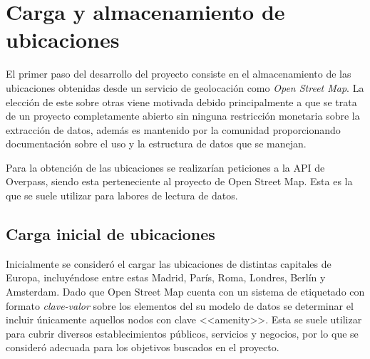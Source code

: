 


\section{Carga y almacenamiento de ubicaciones}

El primer paso del desarrollo del proyecto consiste en el almacenamiento de las ubicaciones obtenidas desde un servicio de geolocación como \textit{Open Street Map}. La elección de este sobre otras viene motivada debido principalmente a que se trata de un proyecto completamente abierto sin ninguna restricción monetaria sobre la extracción de datos, además es mantenido por la comunidad proporcionando documentación sobre el uso y la estructura de datos que se manejan.

Para la obtención de las ubicaciones se realizarían peticiones a la API de Overpass, siendo esta perteneciente al proyecto de Open Street Map. Esta es la que se suele utilizar para labores de lectura de datos.

\subsection{Carga inicial de ubicaciones}

Inicialmente se consideró el cargar las ubicaciones de distintas capitales de Europa, incluyéndose entre estas Madrid, París, Roma, Londres, Berlín y Amsterdam. Dado que Open Street Map cuenta con un sistema de etiquetado con formato \textit{clave-valor} sobre los elementos del su modelo de datos se determinar el incluir únicamente aquellos nodos con clave <<amenity>>. Esta se suele utilizar para cubrir diversos establecimientos públicos, servicios y negocios, por lo que se consideró adecuada para los objetivos buscados en el proyecto.

